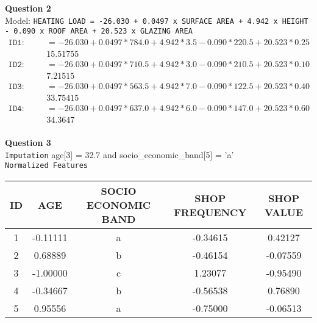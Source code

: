 \documentclass[10pt,a4paper]{article}
\begin{document}
	\textbf{Question 2} \newline \\ Model: \newline
	\texttt{HEATING LOAD = -26.030 + 0.0497 x SURFACE AREA + 4.942 x HEIGHT - 0.090 x ROOF AREA + 20.523 \hspace*{2.7cm} x GLAZING AREA}
	\begin{equation*}
		\begin{split}
			\texttt{ID1: Heating Load} & = - 26.030 + 0.0497 * 784.0 + 4.942 * 3.5 - 0.090 * 220.5 + 20.523 * 0.25 \\
			& 15.51755 \\
			\texttt{ID2: Heating Load} & = - 26.030 + 0.0497 * 710.5 + 4.942 * 3.0 - 0.090 * 210.5 + 20.523 * 0.10 \\
			& 7.21515 \\
			\texttt{ID3: Heating Load} & = - 26.030 + 0.0497 * 563.5 + 4.942 * 7.0 - 0.090 * 122.5 + 20.523 * 0.40 \\
			& 33.75415 \\
			\texttt{ID4: Heating Load} & = - 26.030 + 0.0497 * 637.0 + 4.942 * 6.0 - 0.090 * 147.0 + 20.523 * 0.60 \\
			& 34.3647 \\
		\end{split}
	\end{equation*}
	
	\newpage
	
	\textbf{Question 3} \newline \\ \texttt{Imputation} \newline
		age[3] = 32.7 \hspace{1cm} and \hspace{1cm} socio\_economic\_band[5] = 'a' \newline \\
		\texttt{Normalized Features}
		\begin{table}[h!]
			\begin{tabular}{ccccc}
			\toprule
			\textbf{ID} & \textbf{AGE} & \textbf{SOCIO ECONOMIC BAND} & \textbf{SHOP FREQUENCY} & \textbf{SHOP VALUE} \\ \midrule
			1 & -0.11111 & a & -0.34615 & 0.42127 \\
			2 & 0.68889 & b & -0.46154 & -0.07559 \\
			3 & -1.00000 & c & 1.23077 & -0.95490 \\
			4 & -0.34667 & b & -0.56538 & 0.76890 \\
			5 & 0.95556 & a & -0.75000 & -0.06513 \\ 
			\bottomrule 
		\end{tabular}
		\end{table}
		
\end{document}
